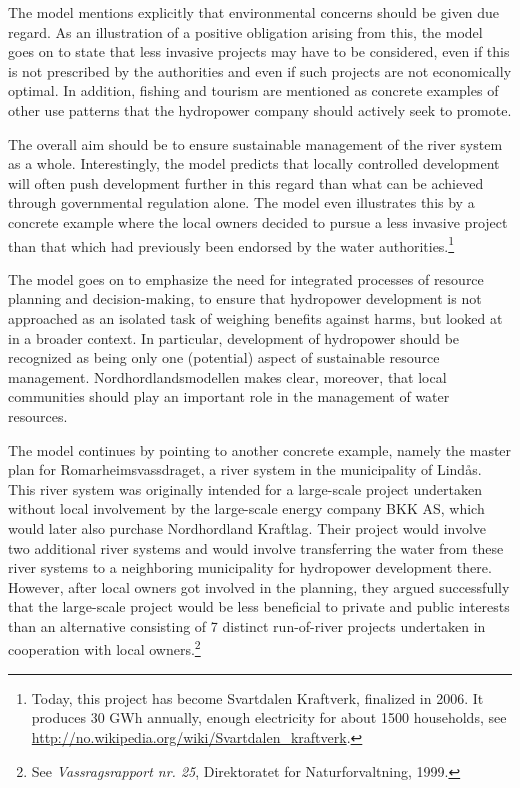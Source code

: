 The model mentions explicitly that environmental concerns should be given due regard. As an illustration of a positive obligation arising from this, the model goes on to state that less invasive projects may have to be considered, even if this is not prescribed by the authorities and even if such projects are not economically optimal. In addition, fishing and tourism are mentioned as concrete examples of other use patterns that the hydropower company should actively seek to promote. 

The overall aim should be to ensure sustainable management of the river system as a whole. Interestingly, the model predicts that locally controlled development will often push development further in this regard than what can be achieved through governmental regulation alone. The model even illustrates this by a concrete example where the local owners decided to pursue a less invasive project than that which had previously been endorsed by the water authorities.\footnote{Today, this project has become Svartdalen Kraftverk, finalized in 2006. It produces 30 GWh annually, enough electricity for about 1500 households, see \url{http://no.wikipedia.org/wiki/Svartdalen_kraftverk}.} 

The model goes on to emphasize the need for integrated processes of resource planning and decision-making, to ensure that hydropower development is not approached as an isolated task of weighing benefits against harms, but looked at in a broader context. In particular, development of hydropower should be recognized as being only one (potential) aspect of sustainable resource management. Nordhordlandsmodellen makes clear, moreover, that local communities should play an important role in the management of water resources.

The model continues by pointing to another concrete example, namely the master plan for Romarheimsvassdraget, a river system in the municipality of Lindås. This river system was originally intended for a large-scale project undertaken without local involvement by the large-scale energy company BKK AS, which would later also purchase Nordhordland Kraftlag. Their project would involve two additional river systems and would involve transferring the water from these river systems to a neighboring municipality for hydropower development there. However, after local owners got involved in the planning, they argued successfully that the large-scale project would be less beneficial to private and public interests than an alternative consisting of 7 distinct run-of-river projects undertaken in cooperation with local owners.\footnote{See {\it Vassragsrapport nr. 25}, Direktoratet for Naturforvaltning, 1999.}

